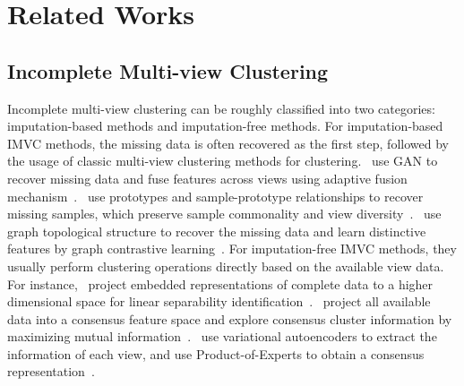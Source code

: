 \section{Related Works}
\subsection{Incomplete Multi-view Clustering}
Incomplete multi-view clustering can be roughly classified into two categories: imputation-based methods and imputation-free methods. For imputation-based IMVC methods, the missing data is often recovered as the first step, followed by the usage of classic multi-view clustering methods for clustering.~\citeauthor{wang2021generative} use GAN to recover missing data and fuse features across views using adaptive fusion mechanism~\cite{wang2021generative}.~\citeauthor{li2023incomplete} use prototypes and sample-prototype relationships to recover missing samples, which preserve sample commonality and view diversity~\cite{li2023incomplete}.~\citeauthor{wang2024joint} use graph topological structure to recover the missing data and learn distinctive features by graph contrastive learning~\cite{wang2024joint}. For imputation-free IMVC methods, they usually perform clustering operations directly based on the available view data. For instance,~\citeauthor{xu2022deep} project embedded representations of complete data to a higher dimensional space for linear separability identification~\cite{xu2022deep}.~\citeauthor{xu2023adaptive} project all available data into a consensus feature space and explore consensus cluster information by maximizing mutual information~\cite{xu2023adaptive}.~\citeauthor{xu2024deep} use variational autoencoders to extract the information of each view, and use Product-of-Experts to obtain a consensus representation~\cite{xu2024deep}.

